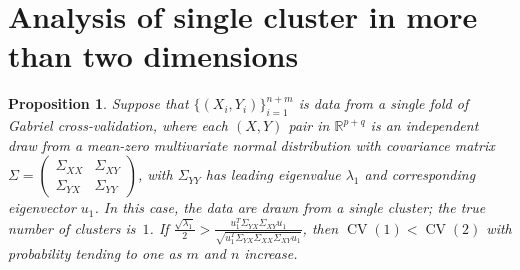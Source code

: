\documentclass[12pt]{article}
\newtheorem{proposition}{Proposition}
\newcommand{\CV}{\operatorname{CV}}
\newcommand{\R}{\mathbb{R}}
\begin{document}
\section{Analysis of single cluster in more than two dimensions}
\label{sec:single-general-dim}

\begin{proposition}\label{prop:single-general-dim}
Suppose that $\{ (X_i, Y_i) \}_{i=1}^{n + m}$ is data from a single fold
of Gabriel cross-validation, where each $(X,Y)$ pair in $\R^{p+q}$ is an
independent draw from a mean-zero multivariate normal distribution with 
covariance matrix $\Sigma = \left( \begin{smallmatrix} \Sigma_{XX} & \Sigma_{XY} \\ 
 \Sigma_{YX} & \Sigma_{YY} \end{smallmatrix}\right)$, with $\Sigma_{YY}$ has leading 
eigenvalue $\lambda_1$ and corresponding eigenvector $u_1$. In this case, the data are drawn
from a single cluster; the true number of clusters is~$1$.  If  $\frac{\sqrt{\lambda_1}}{2}
 > \frac{u^T_1\Sigma_{YX}\Sigma_{XY}u_1}{\sqrt{u^T_1\Sigma_{YX} \Sigma_{XX} \Sigma_{XY} u_1}}$,
then $\CV(1) < \CV(2)$ with probability tending to one as $m$ and $n$ increase.
\end{proposition}
\end{document}
